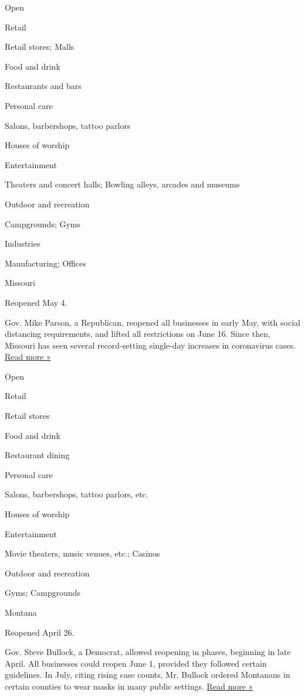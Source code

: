 Open

Retail

Retail stores; Malls

Food and drink

Restaurants and bars

Personal care

Salons, barbershops, tattoo parlors

Houses of worship

Entertainment

Theaters and concert halls; Bowling alleys, arcades and museums

Outdoor and recreation

Campgrounds; Gyms

Industries

Manufacturing; Offices

Missouri

Reopened May 4.

Gov. Mike Parson, a Republican, reopened all businesses in early May,
with social distancing requirements, and lifted all restrictions on June
16. Since then, Missouri has seen several record-setting single-day
increases in coronavirus cases.
\href{https://abcnews.go.com/US/missouri-health-officials-call-aggressive-actions-covid-19/story?id=71998723}{Read
more »}

Open

Retail

Retail stores

Food and drink

Restaurant dining

Personal care

Salons, barbershops, tattoo parlors, etc.

Houses of worship

Entertainment

Movie theaters, music venues, etc.; Casinos

Outdoor and recreation

Gyms; Campgrounds

Montana

Reopened April 26.

Gov. Steve Bullock, a Democrat, allowed reopening in phases, beginning
in late April. All businesses could reopen June 1, provided they
followed certain guidelines. In July, citing rising case counts, Mr.
Bullock ordered Montanans in certain counties to wear masks in many
public settings.
\href{https://montanafreepress.org/2020/07/15/bullock-covid-masks-mandatory/}{Read
more »}

